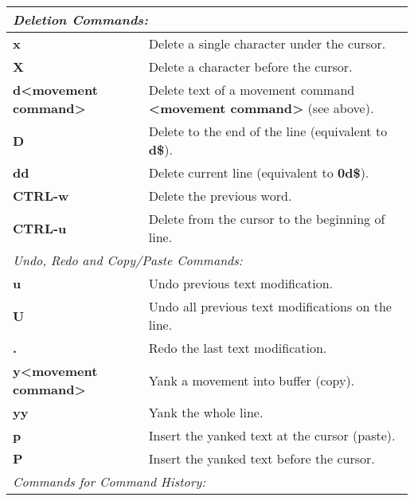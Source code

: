 \documentclass{article}
\begin{document}
\vfill




\newpage

\mbox{}
\begin{tabular}{|p{4.5cm}|p{13cm}|}
\hline
\multicolumn{2}{|l|}{\small\it{Deletion Commands:}} \\
\hline
\textbf{x} & Delete a single character under the cursor. \\
\hline
\textbf{X} & Delete a character before the cursor. \\
\hline
\textbf{d{\textless}movement command{\textgreater}} & Delete text of a movement command \textbf{{\textless}movement command{\textgreater}} (see above). \\
\hline
\textbf{D} & Delete to the end of the line (equivalent to \textbf{d\$}). \\
\hline
\textbf{dd} & Delete current line (equivalent to \textbf{0d\$}). \\
\hline
\textbf{CTRL-w} & Delete the previous word. \\
\hline
\textbf{CTRL-u} & Delete from the cursor to the beginning of line. \\
\hline
\multicolumn{2}{|l|}{\small\it{Undo, Redo and Copy/Paste Commands:}} \\
\hline
\textbf{u} & Undo previous text modification. \\
\hline
\textbf{U} & Undo all previous text modifications on the line. \\
\hline
\textbf{.} & Redo the last text modification. \\
\hline
\textbf{y{\textless}movement command{\textgreater}} & Yank a movement into buffer (copy). \\
\hline
\textbf{yy} & Yank the whole line. \\
\hline
\textbf{p} & Insert the yanked text at the cursor (paste). \\
\hline
\textbf{P} & Insert the yanked text before the cursor. \\
\hline
\multicolumn{2}{|l|}{\small\it{Commands for Command History:}} \\

\end{tabular}
\end{document}

